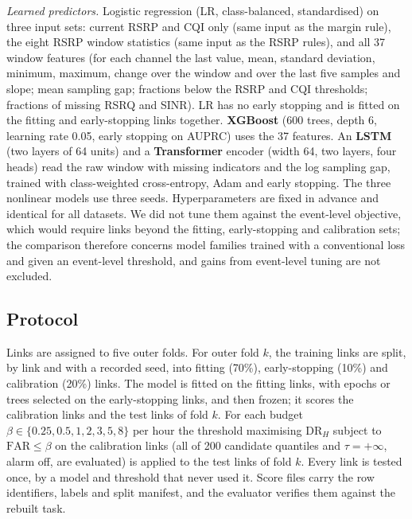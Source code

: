 \documentclass[preprint,review,12pt]{elsarticle}
\newcommand{\FAR}{\mathrm{FAR}}
\newcommand{\DR}{\mathrm{DR}}
\begin{document}
\emph{Learned predictors.} Logistic regression (LR, class-balanced, standardised)
on three input sets: current RSRP and CQI only (same input as the margin rule), the
eight RSRP window statistics (same input as the RSRP rules), and all 37 window
features (for each channel the last value, mean, standard deviation, minimum,
maximum, change over the window and over the last five samples and slope; mean
sampling gap; fractions below the RSRP and CQI thresholds; fractions of missing
RSRQ and SINR). LR has no early stopping and is fitted on the fitting and
early-stopping links together. \textbf{XGBoost} \cite{chen2016xgboost} (600 trees, depth 6, learning
rate 0.05, early stopping on AUPRC) uses the 37 features. An \textbf{LSTM}
\cite{hochreiter1997} (two layers of 64 units) and a \textbf{Transformer} encoder
\cite{vaswani2017} (width 64, two layers, four heads) read the raw window with
missing indicators and the log sampling gap, trained with class-weighted
cross-entropy, Adam and early stopping. The three nonlinear models use three seeds.
Hyperparameters are fixed in advance and identical for all datasets. We did not tune
them against the event-level objective, which would require links beyond the fitting,
early-stopping and calibration sets; the comparison therefore concerns model families
trained with a conventional loss and given an event-level threshold, and gains from
event-level tuning are not excluded.

\subsection{Protocol}
\label{sec:protocol}
Links are assigned to five outer folds. For outer fold $k$, the training links are
split, by link and with a recorded seed, into fitting (70\%), early-stopping (10\%)
and calibration (20\%) links. The model is fitted on the fitting links, with epochs
or trees selected on the early-stopping links, and then frozen; it scores the
calibration links and the test links of fold $k$. For each budget
$\beta\in\{0.25,0.5,1,2,3,5,8\}$ per hour the threshold maximising $\DR_H$ subject
to $\FAR\le\beta$ on the calibration links (all of 200 candidate quantiles and
$\tau=+\infty$, alarm off, are evaluated) is applied to the test links of fold $k$. Every link is tested once, by a model
and threshold that never used it. Score files carry the row identifiers, labels and
split manifest, and the evaluator verifies them against the rebuilt task.
\end{document}
